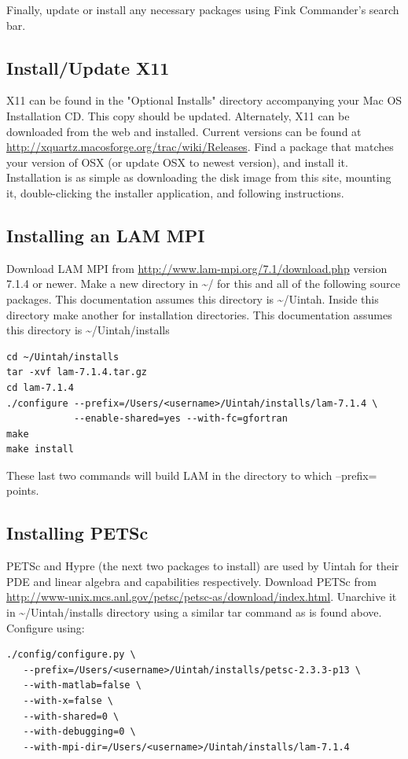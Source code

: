 \documentclass[12pt]{article}
\begin{document}
Finally, update or install any necessary packages using Fink
Commander's search bar.

\subsection{Install/Update X11}
X11 can be found in the "Optional Installs" directory accompanying
your Mac OS Installation CD.  This copy should be updated.
Alternately, X11 can be downloaded from the web and installed.
Current versions can be found at
\url{http://xquartz.macosforge.org/trac/wiki/Releases}.  Find a
package that matches your version of OSX (or update OSX to newest
version), and install it.  Installation is as simple as downloading
the disk image from this site, mounting it, double-clicking the
installer application, and following instructions.

\subsection{Installing an LAM MPI}
Download LAM MPI from \url{http://www.lam-mpi.org/7.1/download.php}
version 7.1.4 or newer.  Make a new directory in \textasciitilde/ for
this and all of the following source packages.  This documentation
assumes this directory is \textasciitilde/Uintah.  Inside this
directory make another for installation directories.  This
documentation assumes this directory is
\textasciitilde/Uintah/installs

\begin{verbatim}
cd ~/Uintah/installs
tar -xvf lam-7.1.4.tar.gz
cd lam-7.1.4
./configure --prefix=/Users/<username>/Uintah/installs/lam-7.1.4 \
            --enable-shared=yes --with-fc=gfortran
make
make install
\end{verbatim}

These last two commands will build LAM in the directory to which
--prefix= points.

\subsection{Installing PETSc}
PETSc and Hypre (the next two packages to install) are used by Uintah
for their PDE and linear algebra and capabilities respectively.
Download PETSc from
\url{http://www-unix.mcs.anl.gov/petsc/petsc-as/download/index.html}.
Unarchive it in \textasciitilde/Uintah/installs directory using a
similar tar command as is found above.  Configure using:

\begin{verbatim}
./config/configure.py \
   --prefix=/Users/<username>/Uintah/installs/petsc-2.3.3-p13 \
   --with-matlab=false \
   --with-x=false \
   --with-shared=0 \
   --with-debugging=0 \
   --with-mpi-dir=/Users/<username>/Uintah/installs/lam-7.1.4
\end{verbatim}
\end{document}
